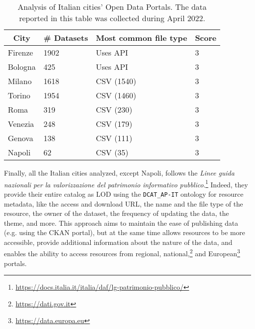 \begin{table}[!ht]
  \onehalfspacing
  \centering
  \begin{tabular}{|l|l|l|l|}
    \hline
    \multicolumn{1}{|c|}{\textbf{City}} & \multicolumn{1}{c|}{\textbf{\# Datasets}} & \multicolumn{1}{c|}{\textbf{Most common file type}} & \multicolumn{1}{c|}{\textbf{Score}} \\ \hline
    Firenze                   & 1902                                             & Uses \acs{API}                                       & 3                                   \\ \hline
    Bologna                   & 425                                              & Uses \acs{API}                                       & 3                                   \\ \hline
    Milano                    & 1618                                             & CSV (1540)                                           & 3                                   \\ \hline
    Torino                    & 1954                                             & CSV (1460)                                           & 3                                   \\ \hline
    Roma                      & 319                                              & CSV (230)                                            & 3                                   \\ \hline
    Venezia                   & 248                                              & CSV (179)                                            & 3                                   \\ \hline
    Genova                    & 138                                              & CSV (111)                                            & 3                                   \\ \hline
    Napoli                    & 62                                               & CSV (35)                                             & 3                                   \\ \hline
  \end{tabular}
  \caption{Analysis of Italian cities' Open Data Portals. The data reported in this table was collected during April 2022.}
  \label{tab:italian-cities}
\end{table}

Finally, all the Italian cities analyzed, except Napoli, follows the \textit{Linee guida nazionali per la valorizzazione del patrimonio informativo pubblico}.\footnote{\url{https://docs.italia.it/italia/daf/lg-patrimonio-pubblico/}} Indeed, they provide their entire catalog as \acl{LOD} using the \verb#DCAT_AP-IT# ontology for resource metadata, like the access and download \acs{URL}, the name and the file type of the resource, the owner of the dataset, the frequency of updating the data, the theme, and more. This approach aims to maintain the ease of publishing data (e.g. using the CKAN portal), but at the same time allows resources to be more accessible, provide additional information about the nature of the data, and enables the ability to access resources from regional, national,\footnote{\url{https://dati.gov.it}} and European\footnote{\url{https://data.europa.eu}} portals.